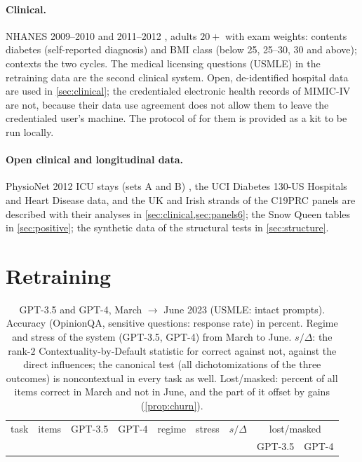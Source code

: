 \documentclass[11pt]{article}
\theoremstyle{definition}
\theoremstyle{remark}
\begin{document}
\paragraph{Clinical.} NHANES 2009--2010 and 2011--2012 \cite{NHANESpkg}, adults $20+$ with exam weights: contents diabetes (self-reported
diagnosis) and BMI class (below 25, 25--30, 30 and above); contexts the two cycles. The medical licensing questions (USMLE) in the
retraining data are the second clinical system. Open, de-identified hospital data are used in \cref{sec:clinical}; the credentialed
electronic health records of MIMIC-IV \cite{MIMICIV} are not, because their data use agreement does not allow them to leave the
credentialed user's machine. The protocol of \cite[\S11]{Bands} for them is provided as a kit to be run locally.

\paragraph{Open clinical and longitudinal data.} PhysioNet 2012 ICU stays (sets A and B) \cite{Silva2012,Goldberger2000}, the UCI
Diabetes 130-US Hospitals \cite{Strack2014,UCIDiabetes} and Heart Disease \cite{Detrano1989,UCIHeart} data, and the UK and Irish strands of
the C19PRC panels \cite{McBride2021,SpikolIE} are described with their analyses in \cref{sec:clinical,sec:panels6}; the Snow Queen tables
\cite{CervantesDzhafarov2018} in \cref{sec:positive}; the synthetic data of the structural tests in \cref{sec:structure}.

\section{Retraining}\label{sec:llm}

\begin{table}[ht]
\centering\footnotesize\setlength{\tabcolsep}{3.5pt}
\caption{GPT-3.5 and GPT-4, March $\to$ June 2023 (USMLE: intact prompts). Accuracy (OpinionQA, sensitive questions: response rate) in
percent. Regime and stress of the system (GPT-3.5, GPT-4) from March to June. $s/\Delta$: the rank-$2$ Contextuality-by-Default statistic
for correct against not, against the direct influences; the canonical test (all dichotomizations of the three outcomes) is noncontextual in
every task as well. Lost/masked: percent of all items correct in March and not in June, and the part of it offset by gains
(\cref{prop:churn}).}\label{tab:llm}
\begin{tabular}{lrcccrccc}
\toprule
task & items & GPT-3.5 & GPT-4 & regime & stress & $s/\Delta$ & \multicolumn{2}{c}{lost/masked}\\
 & & & & & & & GPT-3.5 & GPT-4\\
\midrule

\end{tabular}
\end{table}
\end{document}
